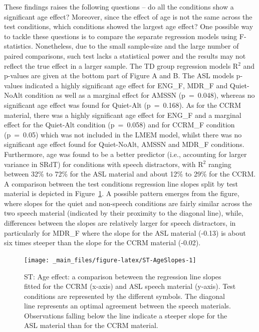 \documentclass[a4paper, twoside]{templates/ociamthesis}
\begin{document}
These findings raises the following questions -- do all the conditions show a significant age effect? Moreover, since the effect of age is not the same across the test conditions, which conditions showed the largest age effect? One possible way to tackle these questions is to compare the separate regression models using F-statistics. Nonetheless, due to the small sample-size and the large number of paired comparisons, such test lacks a statistical power and the results may not reflect the true effect in a larger sample. The TD group regression models R\(^{2}\) and p-values are given at the bottom part of Figure A and B. The ASL models p-values indicated a highly significant age effect for ENG\_F, MDR\_F and Quiet-NoAlt condition as well as a marginal effect for AMSSN (p~=~0.048), whereas no significant age effect was found for Quiet-Alt (p~=~0.168). As for the CCRM material, there was a highly significant age effect for ENG\_F and a marginal effect for the Quiet-Alt condition (p~=~0.058) and for CCRM\_F condition (p~=~0.05) which was not included in the LMEM model, whilst there was no significant age effect found for Quiet-NoAlt, AMSSN and MDR\_F conditions. Furthermore, age was found to be a better predictor (i.e., accounting for larger variance in SRdT) for conditions with speech distractors, with R\(^{2}\) ranging between 32\% to 72\% for the ASL material and about 12\% to 29\% for the CCRM. A comparison between the test conditions regression line slopes split by test material is depicted in Figure~\ref{fig:ST-AgeSlopes}. A possible pattern emerges from the figure, where slopes for the quiet and non-speech conditions are fairly similar across the two speech material (indicated by their proximity to the diagonal line), while, differences between the slopes are relatively larger for speech distractors, in particularly for MDR\_F where the slope for the ASL material (-0.13) is about six times steeper than the slope for the CCRM material (-0.02).\\

\begin{figure}

{\centering \texttt{[image: \_main\_files/figure-latex/ST-AgeSlopes-1]} 

}

\caption{ST: Age effect: a comparison beteween the regression line slopes fitted for the CCRM (x-axis) and ASL speech material (y-axis). Test conditions are represented by the different symbols. The diagonal line represents an optimal agreement between the speech materials. Observations falling below the line indicate a steeper slope for the ASL material than for the CCRM material.}\label{fig:ST-AgeSlopes}
\end{figure}
\end{document}
